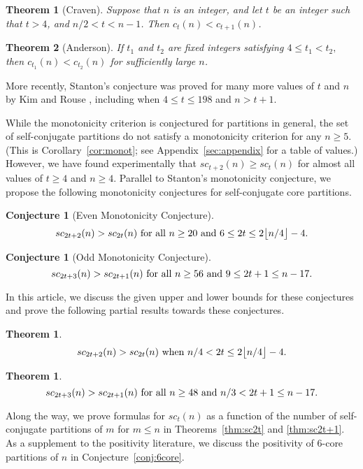 \documentclass[12pt,leqno]{amsart}
\newtheorem{thm}[lem]{Theorem}
\newtheorem{conj}[lem]{Conjecture}
\newtheorem*{thrm}{Theorem}
\numberwithin{equation}{section}
\theoremstyle{definition}
\begin{document}
\begin{thrm}[Craven]
Suppose that $n$ is an integer, and let $t$ be an integer such that $t > 4$, and $n/2 < t < n-1$.
Then $c_t(n) < c_{t+1}(n)$.
\end{thrm}

\begin{thrm}[Anderson]
If $t_1$ and $t_2$ are fixed integers satisfying $4\leq t_1 < t_2,$ then $c_{t_1}(n)<c_{t_2}(n)$ for sufficiently large $n$.
\end{thrm}

More recently, Stanton's conjecture was proved for many more values of $t$ and $n$ by Kim and Rouse \cite{KimRouse}, including when $4\leq t\leq 198$ and $n>t+1$.

While the monotonicity criterion is conjectured for partitions in general, the set of self-conjugate partitions do not satisfy a monotonicity criterion for any $n\geq 5$.  (This is Corollary~\ref{cor:monot}; see Appendix~\ref{sec:appendix} for a table of values.)  However, we have found experimentally that $sc_{t+2}(n)\geq sc_{t}(n)$ for almost all values of $t\geq 4$ and $n\geq 4$.  Parallel to Stanton's monotonicity conjecture, we propose the following monotonicity conjectures for self-conjugate core partitions. 
\begin{conj}[Even Monotonicity Conjecture] 
\[sc_{2t+2}(n)> sc_{2t}(n) \textup{ for all } n\geq 20 \textup{ and } 6\leq 2t\leq 2\big\lfloor n/4\big\rfloor -4.\]  
\label{conj:even}
\end{conj}

\begin{conj}[Odd Monotonicity Conjecture] 
\[sc_{2t+3}(n)> sc_{2t+1}(n) \textup{ for all } n\geq 56 \textup{ and } 9\leq 2t+1\leq n-17.\]
\label{conj:odd}
\end{conj}

In this article, we discuss the given upper and lower bounds for these conjectures and prove the following partial results towards these conjectures. 

\begin{thm} 
\label{thm:evenPC}
\[sc_{2t+2}(n)> sc_{2t}(n) \textup{ when } n/4< 2t\leq 2\big\lfloor n/4\big\rfloor -4. \]  
\end{thm}

\begin{thm} 
\label{thm:oddPC}
\[sc_{2t+3}(n)> sc_{2t+1}(n) \textup{ for all } n\geq 48 \textup{ and } n/3< 2t+1\leq n-17.\]
\end{thm}

Along the way, we prove formulas for $sc_t(n)$ as a function of the number of self-conjugate partitions of $m$ for $m\leq n$ in Theorems~\ref{thm:sc2t} and \ref{thm:sc2t+1}.  As a supplement to the positivity literature, we discuss the positivity of $6$-core partitions of $n$ in Conjecture~\ref{conj:6core}.  
\end{document}
